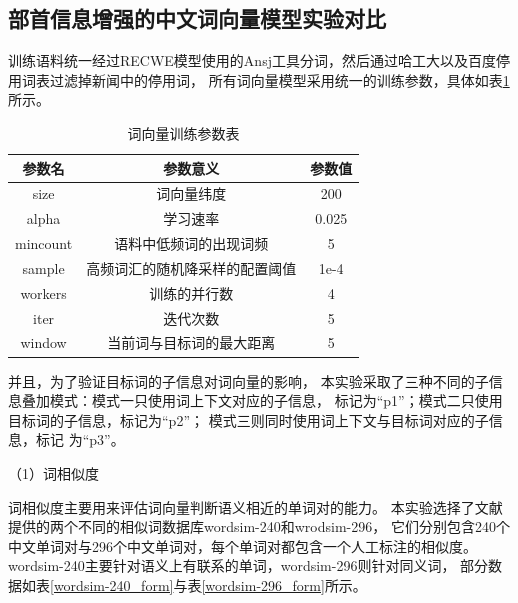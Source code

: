\documentclass{standalone}
\begin{document}
\subsection{部首信息增强的中文词向量模型实验对比}
训练语料统一经过RECWE模型使用的Ansj工具分词，然后通过哈工大以及百度停用词表过滤掉新闻中的停用词，
所有词向量模型采用统一的训练参数，具体如表\ref{word_vec_arg_form}所示。
\begin{table}[h]
    \caption{词向量训练参数表}
    \begin{tabular}{|c|c|c|}
        \hline
        参数名 & 参数意义 & 参数值 \\
        \hline
        size & 词向量纬度 & 200 \\
        \hline
        alpha & 学习速率 & 0.025 \\
        \hline
        mincount & 语料中低频词的出现词频 & 5 \\
        \hline
        sample & 高频词汇的随机降采样的配置阈值 & 1e-4 \\
        \hline
        workers & 训练的并行数 & 4 \\
        \hline
        iter & 迭代次数 & 5 \\
        \hline
        window & 当前词与目标词的最大距离 & 5 \\
        \hline
    \end{tabular}
    \label{word_vec_arg_form}
    \end{table}

并且，为了验证目标词的子信息对词向量的影响，
本实验采取了三种不同的子信息叠加模式：模式一只使用词上下文对应的子信息，
标记为“p1”；模式二只使用目标词的子信息，标记为“p2”；
模式三则同时使用词上下文与目标词对应的子信息，标记
为“p3”。

（1）词相似度

词相似度主要用来评估词向量判断语义相近的单词对的能力。
本实验选择了文献\cite{chen2015joint}提供的两个不同的相似词数据库wordsim-240和wrodsim-296，
它们分别包含240个中文单词对与296个中文单词对，每个单词对都包含一个人工标注的相似度。
wordsim-240主要针对语义上有联系的单词，wordsim-296则针对同义词，
部分数据如表\ref{wordsim-240_form}与表\ref{wordsim-296_form}所示。
\end{document}
